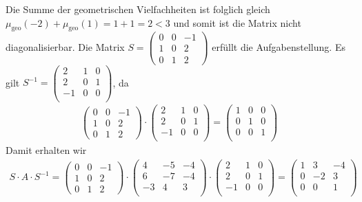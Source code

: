 \documentclass{article}
\newcommand{\mgeo}[1]{\mu_{\operatorname{geo}} \left( {#1} \right)}
\begin{document}
    Die Summe der geometrischen Vielfachheiten ist folglich gleich $\mgeo{-2} + \mgeo{1} = 1 + 1 = 2 < 3$ und somit ist die Matrix nicht diagonalisierbar.
    Die Matrix $S = \begin{pmatrix}
        0 & 0 & -1\\
        1 & 0 & 2\\
        0 & 1 & 2
    \end{pmatrix}$ erfüllt die Aufgabenstellung. Es gilt $S^{-1} = \begin{pmatrix}
        2 & 1 & 0\\
        2 & 0 & 1\\
        -1 & 0 & 0\\
    \end{pmatrix}$, da
    \begin{align*}
        \begin{pmatrix}
            0 & 0 & -1\\
            1 & 0 & 2\\
            0 & 1 & 2
        \end{pmatrix} \cdot
        \begin{pmatrix}
            2 & 1 & 0\\
            2 & 0 & 1\\
            -1 & 0 & 0\\
        \end{pmatrix} =
        \begin{pmatrix}
            1 & 0 & 0\\
            0 & 1 & 0\\
            0 & 0 & 1\\
        \end{pmatrix}
    \end{align*}
    Damit erhalten wir
    \begin{align*}
        S \cdot A \cdot S^{-1} = \begin{pmatrix}
            0 & 0 & -1\\
            1 & 0 & 2\\
            0 & 1 & 2
        \end{pmatrix} \cdot
        \begin{pmatrix}
            4 & -5 & -4\\
            6 & -7 & -4\\
            -3 & 4 & 3\\
        \end{pmatrix} \cdot
        \begin{pmatrix}
            2 & 1 & 0\\
            2 & 0 & 1\\
            -1 & 0 & 0\\
        \end{pmatrix} =
        \begin{pmatrix}
            1 & 3 & -4\\
            0 & -2 & 3\\
            0 & 0 & 1\\
        \end{pmatrix}
    \end{align*}
\end{document}
